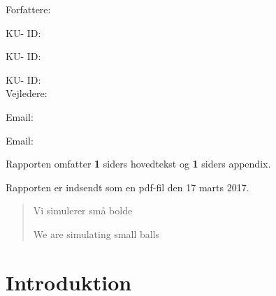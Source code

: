 \documentclass[12pt,oneside,a4paper]{article}
\begin{document}
\vfill
{\large Forfattere:}\\
{\large \hspace*{1cm}   \hspace{1cm} KU- ID:  \\
{\large \hspace*{1cm}    \hspace{1cm} KU- ID:  \\
{\large \hspace*{1cm}    \hspace{1cm} KU- ID:  \\ 
        
{\large Vejledere:}\\
{\large \hspace*{1cm}   \hspace{1cm} Email:  \\
{\large \hspace*{1cm}     \hspace{1cm} Email:  \\

\vfill

{\large Rapporten omfatter {\bf 1} siders hovedtekst og {\bf 1} siders appendix.}

{\large Rapporten er indsendt som en pdf-fil den 17 marts 2017. }

\normalsize

\newpage

\begin{abstract}
    Vi simulerer små bolde 
    
    We are simulating small balls
\end{abstract}

\newpage

\tableofcontents

\newpage


\section{Introduktion}

}}}}}
\end{document}
